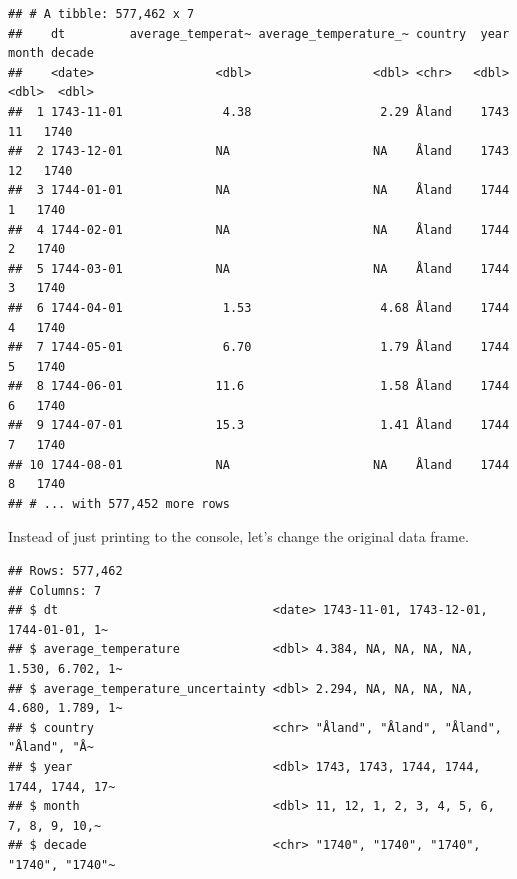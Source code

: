 \documentclass[
]{book}
\newenvironment{Shaded}{\begin{snugshade}}{\end{snugshade}}
\newcommand{\CharTok}[1]{\textcolor[rgb]{0.31,0.60,0.02}{#1}}
\newcommand{\CommentTok}[1]{\textcolor[rgb]{0.56,0.35,0.01}{\textit{#1}}}
\newcommand{\DataTypeTok}[1]{\textcolor[rgb]{0.13,0.29,0.53}{#1}}
\newcommand{\KeywordTok}[1]{\textcolor[rgb]{0.13,0.29,0.53}{\textbf{#1}}}
\newcommand{\NormalTok}[1]{#1}
\newcommand{\OperatorTok}[1]{\textcolor[rgb]{0.81,0.36,0.00}{\textbf{#1}}}
\newcommand{\StringTok}[1]{\textcolor[rgb]{0.31,0.60,0.02}{#1}}
\begin{document}
\begin{verbatim}
## # A tibble: 577,462 x 7
##    dt         average_temperat~ average_temperature_~ country  year month decade
##    <date>                 <dbl>                 <dbl> <chr>   <dbl> <dbl>  <dbl>
##  1 1743-11-01              4.38                  2.29 Åland    1743    11   1740
##  2 1743-12-01             NA                    NA    Åland    1743    12   1740
##  3 1744-01-01             NA                    NA    Åland    1744     1   1740
##  4 1744-02-01             NA                    NA    Åland    1744     2   1740
##  5 1744-03-01             NA                    NA    Åland    1744     3   1740
##  6 1744-04-01              1.53                  4.68 Åland    1744     4   1740
##  7 1744-05-01              6.70                  1.79 Åland    1744     5   1740
##  8 1744-06-01             11.6                   1.58 Åland    1744     6   1740
##  9 1744-07-01             15.3                   1.41 Åland    1744     7   1740
## 10 1744-08-01             NA                    NA    Åland    1744     8   1740
## # ... with 577,452 more rows
\end{verbatim}

Instead of just printing to the console, let's change the original data frame.

\begin{Shaded}
\end{Shaded}

\begin{verbatim}
## Rows: 577,462
## Columns: 7
## $ dt                              <date> 1743-11-01, 1743-12-01, 1744-01-01, 1~
## $ average_temperature             <dbl> 4.384, NA, NA, NA, NA, 1.530, 6.702, 1~
## $ average_temperature_uncertainty <dbl> 2.294, NA, NA, NA, NA, 4.680, 1.789, 1~
## $ country                         <chr> "Åland", "Åland", "Åland", "Åland", "Å~
## $ year                            <dbl> 1743, 1743, 1744, 1744, 1744, 1744, 17~
## $ month                           <dbl> 11, 12, 1, 2, 3, 4, 5, 6, 7, 8, 9, 10,~
## $ decade                          <chr> "1740", "1740", "1740", "1740", "1740"~
\end{verbatim}
\end{document}
